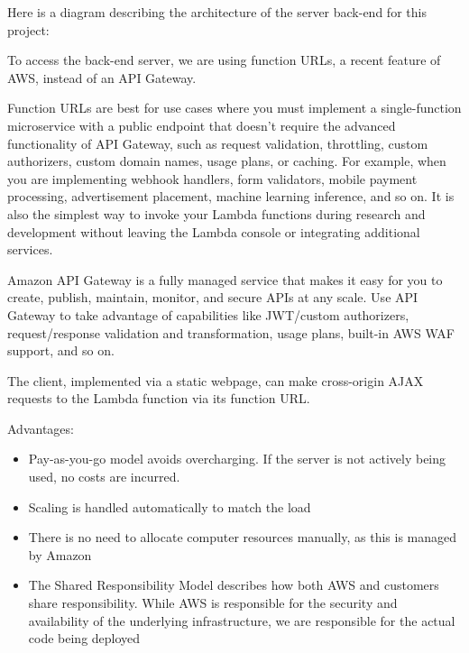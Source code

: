 Here is a diagram describing the architecture of the server back-end for this project:


To access the back-end server, we are using function URLs, a recent feature of AWS, instead of an API Gateway.

Function URLs are best for use cases where you must implement a single-function microservice with a public endpoint that doesn't require the advanced functionality of API Gateway, such as request validation, throttling, custom authorizers, custom domain names, usage plans, or caching. For example, when you are implementing webhook handlers, form validators, mobile payment processing, advertisement placement, machine learning inference, and so on. It is also the simplest way to invoke your Lambda functions during research and development without leaving the Lambda console or integrating additional services.

Amazon API Gateway is a fully managed service that makes it easy for you to create, publish, maintain, monitor, and secure APIs at any scale. Use API Gateway to take advantage of capabilities like JWT/custom authorizers, request/response validation and transformation, usage plans, built-in AWS WAF support, and so on. \cite{casalboni-2022}

The client, implemented via a static webpage, can make cross-origin AJAX requests to the Lambda function via its function URL.

Advantages:

\begin{itemize}
\item Pay-as-you-go model avoids overcharging. If the server is not actively being used, no costs are incurred.
\item Scaling is handled automatically to match the load
\item There is no need to allocate computer resources manually, as this is managed by Amazon
\item The Shared Responsibility Model describes how both AWS and customers share responsibility. While AWS is responsible for the security and availability of the underlying infrastructure, we are responsible for the actual code being deployed \cite{amazon-web-services-inc-2022B}
\end{itemize}


